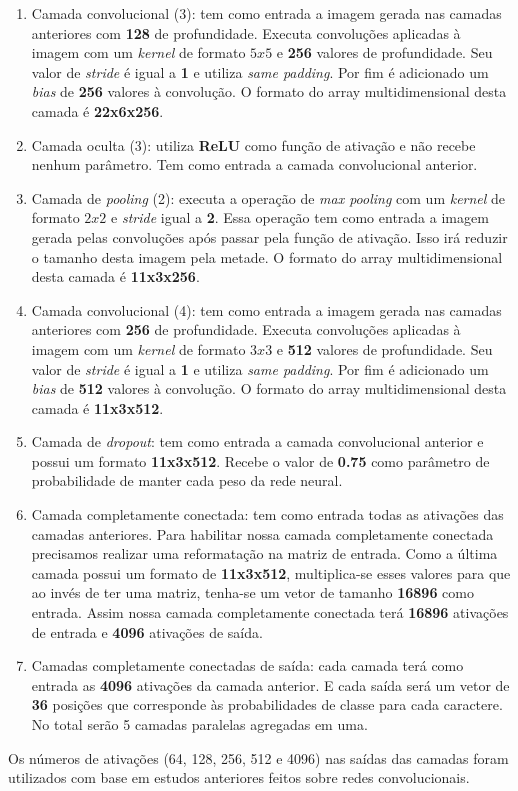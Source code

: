 \begin{enumerate}
\item Camada convolucional (3): tem como entrada a imagem gerada
  nas camadas anteriores com {\bf 128} de profundidade. Executa
  convoluções aplicadas à imagem com um \textit{kernel} de formato
  $5x5$ e {\bf 256} valores de profundidade. Seu valor de
  \textit{stride} é igual a {\bf 1} e utiliza \textit{same
    padding}. Por fim é adicionado um \textit{bias} de {\bf 256}
  valores à convolução. O formato do array multidimensional desta
  camada é {\bf 22x6x256}.

\item Camada oculta (3): utiliza {\bf ReLU} como função de ativação e
  não recebe nenhum parâmetro. Tem como entrada a camada convolucional
  anterior.

\item Camada de \textit{pooling} (2): executa a operação de
  \textit{max pooling} com um \textit{kernel} de formato $2x2$ e
  \textit{stride} igual a {\bf 2}. Essa operação tem como entrada a
  imagem gerada pelas convoluções após passar pela função de
  ativação. Isso irá reduzir o tamanho desta imagem pela metade. O
  formato do array multidimensional desta camada é {\bf 11x3x256}.

\item Camada convolucional (4): tem como entrada a imagem gerada
  nas camadas anteriores com {\bf 256} de profundidade. Executa
  convoluções aplicadas à imagem com um \textit{kernel} de formato
  $3x3$ e {\bf 512} valores de profundidade. Seu valor de
  \textit{stride} é igual a {\bf 1} e utiliza \textit{same
    padding}. Por fim é adicionado um \textit{bias} de {\bf 512}
  valores à convolução. O formato do array multidimensional desta
  camada é {\bf 11x3x512}.

\item Camada de \textit{dropout}: tem como entrada a camada
  convolucional anterior e possui um formato {\bf 11x3x512}. Recebe o
  valor de {\bf 0.75} como parâmetro de probabilidade de manter cada
  peso da rede neural.

\item Camada completamente conectada: tem como entrada todas as
  ativações das camadas anteriores. Para habilitar nossa camada
  completamente conectada precisamos realizar uma reformatação na
  matriz de entrada. Como a última camada possui um formato de {\bf
    11x3x512}, multiplica-se esses valores para que ao invés de
  ter uma matriz, tenha-se um vetor de tamanho {\bf 16896} como
  entrada. Assim nossa camada completamente conectada terá {\bf 16896}
  ativações de entrada e {\bf 4096} ativações de saída.

\item Camadas completamente conectadas de saída: cada camada terá como
  entrada as {\bf 4096} ativações da camada anterior. E cada saída
  será um vetor de {\bf 36} posições que corresponde às probabilidades
  de classe para cada caractere. No total serão 5 camadas paralelas
  agregadas em uma.

\end{enumerate}

Os números de ativações (64, 128, 256, 512 e 4096) nas saídas das
camadas foram utilizados com base em estudos anteriores feitos sobre
redes convolucionais\cite{Krizhevsky}.